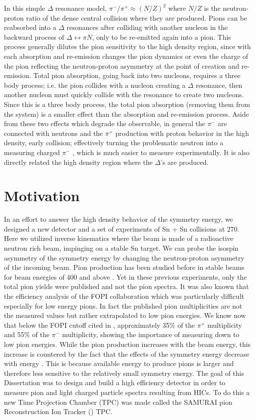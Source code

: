 In this simple $\Delta$ resonance model, $\pi^-/\pi^+ \approx (N/Z)^2$ where $N/Z$ is the neutron-proton ratio of the dense central collision where they are produced. Pions can be reabsorbed into a $\Delta$ resonances after colliding with another nucleon in the backward process of $\Delta \leftrightarrow \pi N$, only to be re-emitted again into a pion. This process generally dilutes the pion sensitivity to the high density region, since with each absorption and re-emission changes the pion dynamics or even the charge of the pion reflecting the neutron-proton asymmetry at the point of creation and re-emission. Total pion absorption, going back into two nucleons, requires a three body process; i.e. the pion collides with a nucleon creating a $\Delta$ resonance, then another nucleon must quickly collide with the resonance to create two nucleons. Since this is a three body process, the total pion absorption (removing them from the system) is a smaller effect than the absorption and re-emission process. Aside from these two effects which degrade the observable, in general the $\pi^-$ are connected with neutrons and the $\pi^+$ production with proton behavior in the high density, early collision; effectively turning the problematic neutron into a measuring charged $\pi^-$ , which is much easier to measure experimentally. It is also directly related the high density region where the $\Delta$'s are produced.  

\section{Motivation}
In an effort to answer the high density behavior of the symmetry energy, we designed a new detector and a set of experiments of Sn + Sn collisions at \SI{270}{\MeVA}. Here we utilized inverse kinematics where the beam is made of a radioactive neutron rich beam, impinging on a stable Sn target. We can probe the isospin asymmetry of the symmetry energy by changing the neutron-proton asymmetry of the incoming beam. Pion production has been studied before in stable beams for beam energies of \SI{400}{\MeVA} and above \cite{fopi}. Yet in these previous experiments, only the total pion yields were published and not the pion spectra. It was also known that the efficiency analysis of the FOPI collaboration \cite{fopi} which was particularly difficult especially for low energy pions. In fact the published pion multiplicities are not the measured values but rather extrapolated to low pion energies. We know now that below the FOPI cutoff cited in \cite{fopi}, approximately 35\% of the $\pi^+$ multiplicity and 55\% of the $\pi^-$ multiplicity, showing the importance of measuring down to low pion energies. While the pion production increases with the beam energy, this increase is countered by the fact that the effects of the symmetry energy decrease with energy \cite{fopi}. This is because available energy to produce pions is larger and therefore less sensitive to the relatively small symmetry energy.  The goal of this Dissertation was to design and build a high efficiency detector in order to measure pion and light charged particle spectra resulting from HICs. To do this a new Time Projection Chamber (TPC) was made called the SAMURAI pion Reconstruction Ion Tracker (\spirit) TPC.

